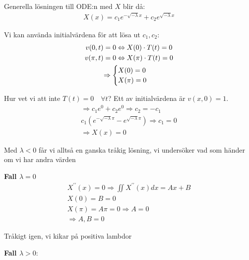 \noindent Generella lösningen till ODE:n med $X$ blir då:
\begin{equation*}
  \begin{gathered}
    X(x) = c_1e^{-\sqrt{-\lambda}x}+c_2e^{\sqrt{-\lambda}x}
  \end{gathered}
\end{equation*}
\par\bigskip
\noindent Vi kan använda initialvärdena för att lösa ut $c_1,c_2$:
\begin{equation*}
  \begin{gathered}
    v(0,t) = 0\Leftrightarrow X(0)\cdot T(t) = 0\\
    v(\pi,t) = 0\Leftrightarrow X(\pi)\cdot T(t) = 0\\
    \Rightarrow\begin{cases}X(0) = 0\\X(\pi) = 0\end{cases}
  \end{gathered}
\end{equation*}\par
\noindent Hur vet vi att inte $T(t) = 0\quad\forall t$? Ett av initialvärdena är $v(x,0) = 1$.
\begin{equation*}
  \begin{gathered}
    \Rightarrow c_1e^{0}+c_2e^{0} \Rightarrow c_2 = -c_1\\
    c_1\left(e^{-\sqrt{-\lambda}\pi}-e^{\sqrt{-\lambda}\pi}\right)\Rightarrow c_1 = 0\\
    \Rightarrow X(x) = 0
  \end{gathered}
\end{equation*}
\par\bigskip
\noindent Med $\lambda<0$ får vi alltså en ganska tråkig lösning, vi undersöker vad som händer om vi har andra värden
\par\bigskip
\noindent\textbf{Fall $\lambda = 0$}
\begin{equation*}
  \begin{gathered}
    X^{\prime\prime}(x) = 0\Rightarrow \iint X^{\prime\prime}(x) dx = Ax+B\\
    X(0) = B = 0\\
    X(\pi) = A\pi =0\Rightarrow A = 0\\
    \Rightarrow A,B = 0
  \end{gathered}
\end{equation*}
\par\bigskip
\noindent Tråkigt igen, vi kikar på positiva lambdor
\par\bigskip
\noindent\textbf{Fall $\lambda>0$}:
